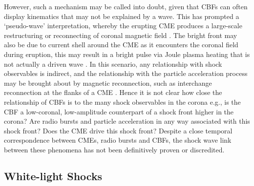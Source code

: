 However, such a mechanism may be called into doubt, given that CBFs can often display kinematics that may not be explained by a wave. This has prompted a `pseudo-wave' interpretation, whereby the erupting CME produces a large-scale restructuring or reconnecting of coronal magnetic field \citep{chen2002, attrill2007}. The bright front may also be due to current shell around the CME as it encounters the coronal field during eruption, this may result in a bright pulse via Joule plasma heating that is not actually a driven wave \citep{delannee2008}. In this scenario, any relationship with shock observables is indirect, and the relationship with the particle acceleration process may be brought about by magnetic reconnection, such as interchange reconnection at the flanks of a CME \citep{maia2004}. Hence it is not clear how close the relationship of CBFs is to the many shock observables in the corona e.g., is the CBF a low-coronal, low-amplitude counterpart of a shock front higher in the corona? Are radio bursts and particle acceleration in any way associated with this shock front? Does the CME drive this shock front? Despite a close temporal correspondence between CMEs, radio bursts and CBFs, the shock wave link between these phenomena has not been definitively proven or discredited.

\subsection{White-light Shocks}

